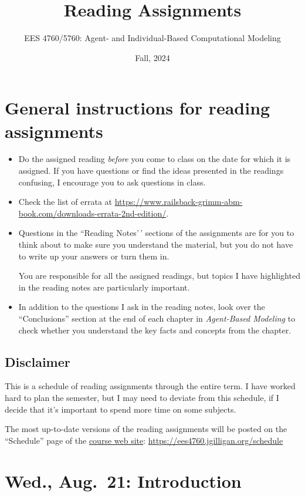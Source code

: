 \documentclass[
]{article}
\title{Reading Assignments}
\author{EES 4760/5760: Agent- and Individual-Based Computational
Modeling}
\date{Fall, 2024}
\begin{document}
\maketitle

\section{General instructions for reading
assignments}\label{general-instructions-for-reading-assignments}

\begin{itemize}
\item
  Do the assigned reading \emph{before\/} you come to class on the date
  for which it is assigned. If you have questions or find the ideas
  presented in the readings confusing, I encourage you to ask questions
  in class.
\item
  Check the list of errata at
  \url{https://www.railsback-grimm-abm-book.com/downloads-errata-2nd-edition/}.
\item
  Questions in the ``Reading Notes'\,' sections of the assignments are
  for you to think about to make sure you understand the material, but
  you do not have to write up your answers or turn them in.

  You are responsible for all the assigned readings, but topics I have
  highlighted in the reading notes are particularly important.
\item
  In addition to the questions I ask in the reading notes, look over the
  ``Conclusions'' section at the end of each chapter in
  \emph{Agent-Based Modeling} to check whether you understand the key
  facts and concepts from the chapter.
\end{itemize}

\subsection{Disclaimer}\label{disclaimer}

This is a schedule of reading assignments through the entire term. I
have worked hard to plan the semester, but I may need to deviate from
this schedule, if I decide that it's important to spend more time on
some subjects.

The most up-to-date versions of the reading assignments will be posted
on the ``Schedule'' page of the
\href{https://ees4760.jgilligan.org/schedule}{course web site}:
\url{https://ees4760.jgilligan.org/schedule}

\section{Wed., Aug.~21: Introduction}\label{wed.-aug.-21-introduction}
\end{document}
